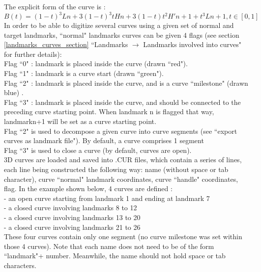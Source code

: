 The explicit form of the curve is :
\begin{equation}
B(t) = (1-t)^{3}Ln + 3(1-t)^{3}tHn + 3(1-t)t^{2}H'n+1 +t^{3}Ln+1, t \in[0,1]
\end{equation}
In order to be able to digitize several curves using a given set of normal and target landmarks,
``normal" landmarks curves can be given 4 flags (see section \ref{landmarks_curves_section} ``Landmarks $\rightarrow$ Landmarks
involved into curves" for further details):\\
Flag ``0" : landmark is placed inside the curve (drawn ``red").\\
Flag ``1" : landmark is a curve start (drawn ``green").\\
Flag ``2" : landmark is placed inside the curve, and is a curve ``milestone" (drawn blue) .\\
Flag ``3" : landmark is placed inside the curve, and should be connected to the preceding curve
starting point. When landmark n is flagged that way, landmarkn+1 will be set as a curve starting point.\\
Flag ``2" is used to decompose a given curve into curve segments (see ``export curves as landmark file"). By default, a curve comprises 1 segment\\
Flag ``3" is used to close a curve (by default, curves are open).\\
3D curves are loaded and saved into .CUR files, which contain a series of lines, each line being
constructed the following way: name (without space or tab character), curve ``normal" landmark
coordinates, curve ``handle" coordinates, flag.
In the example shown below, 4 curves are defined :\\
- an open curve starting from landmark 1 and ending at landmark 7\\
- a closed curve involving landmarks 8 to 12\\
- a closed curve involving landmarks 13 to 20\\
- a closed curve involving landmarks 21 to 26\\
These four curves contain only one segment (no curve milestone was set within those 4 curves).
Note that each name does not need to be of the form ``landmark"+ number. Meanwhile, the name
should not hold space or tab characters.
